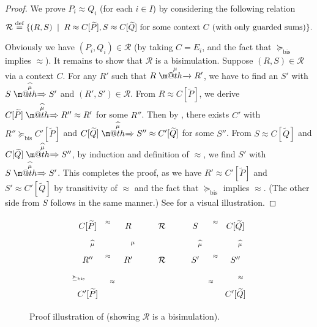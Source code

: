 \documentclass[GCNS]{yincog}
\makeatletter
\def \rightarrowfill{$\m@th\mathord{\smash-}\mkern-6mu%
  \cleaders\hbox{$\mkern-2mu\mathord{\smash-}\mkern-2mu$}\hfill
  \mkern-6mu\mathord\rightarrow$}
\def \rightarrowfillWEAK{$\m@th\mathord{\smash=}\mkern-6mu%
  \cleaders\hbox{$\mkern-2mu\mathord{\smash=}\mkern-2mu$}\hfill
  \mkern-6mu\mathord\Rightarrow$}
\theoremstyle{remark}
\theoremstyle{theorem}
\theoremstyle{remark}
\newcommand{\arr}[1]{\mathrel{\stackrel{{\;\;#1\;\;}}{\mbox{\rightarrowfill}}}}
\newcommand{\Arcap}[1]{\mathrel{\stackrel{{\;\;{\widehat{#1}}\;\;}}{\mbox{\rightarrowfillWEAK}}}}
\newcommand{\ctvtex}[1]{ C \brac{#1} }
\newcommand{\qct}{ C }
\newcommand{\brac}[1]{[#1] }
\def\Rvtex{\mathcal{R}}
\def\stvtex{\; \mid \;}
\def\DSdefi{\stackrel{\text{def}}{=}}
\renewcommand{\tilde}{\widetilde}
\newcommand{\wbvtex}{\approx}
\newcommand{\mcontrBIS}{\mathrel{\succeq_{\mathrm{bis}}}}
\newcommand{\til}{\tilde}
\makeatother
\begin{document}
\begin{proof}
We prove $P_i \wbvtex Q_i$ (for each $i \in I$) by considering the following
relation
%
\begin{equation*}
\Rvtex \DSdefi \{(R,S) \stvtex R \wbvtex \ctvtex{\til P}, S \wbvtex
\ctvtex{\til Q}
\mbox{~for some context $\qct $ (with only guarded sums)} \} .
\end{equation*}

Obviously we have $(P_i,Q_i) \in \Rvtex $ (by taking $C = E_i$, and the
fact that $\mcontrBIS $ implies $\wbvtex $). It remains to show that
$\Rvtex $ is a bisimulation. Suppose $(R, S) \in \Rvtex $ via a context
$C$. For any $R'$ such that $R \arr{\mu} R'$, we have to find an
$S'$ with $S \Arcap{\mu} S'$ and $(R', S') \in \Rvtex $. From
$R \wbvtex C[{\til P}]$, we derive
$C[{\til P}] \Arcap{\mu} R'' \wbvtex R'$ for some $R''$. Then by ,
there exists $C'$ with $R'' \mcontrBIS C'[{\til P}]$ and
$C[{\til Q}] \Arcap{\mu} S'' \wbvtex C'[{\til Q}]$ for some $S''$. From
$S \wbvtex C[{\til Q}]$ and $C[{\til Q}] \Arcap{\mu} S''$, by induction
and definition of $\wbvtex $, we find $S'$ with $S \Arcap{\mu} S'$. This
completes the proof, as we have $R' \wbvtex C'[{\til P}]$ and
$S' \wbvtex C'[{\til Q}]$ by transitivity of $\wbvtex $ and the fact that
$\mcontrBIS $ implies $\wbvtex $. (The other side from $S$ follows in the
same manner.) See  for a visual illustration.
\end{proof}

\begin{figure}%
\vspace{-12pt}
\begin{sgmlfig}\normalsize
%
$$
\xymatrix{
{C[{\til P}]} \ar@{.}[r]^{\wbvtex} \ar@{=>}[d]^{\widehat{\mu}} & {R} \ar@{-}[r]
\ar@{->}[d]^{\mu} & {\Rvtex} \ar@{-}[r] & {S} \ar@{.}[r]^{\wbvtex}
\ar@{=>}[d]^{\widehat{\mu}} & {C[{\til Q}]} \ar@{=>}[d]^{\widehat{\mu}} \\
{R''} \ar@{.}[d]_{\mcontrBIS} \ar@{.}[r]^{\wbvtex} & {R'} \ar@{-}[r]
\ar@{.}[ld]^{\wbvtex} & {\Rvtex} \ar@{-}[r] & {S'} \ar@{.}[r]^{\wbvtex} \ar@{.}[rd]_{\wbvtex}
& {S''} \ar@{.}[d]^{\wbvtex} \\
{C'[{\til P}]} & {} & {} & {} & {C'[{\til Q}]}
}
%
$$\vspace{-12pt}
\end{sgmlfig}
%
\caption{Proof illustration of  (showing
$\Rvtex $ is a bisimulation).}
 \label{fig:310}
\end{figure}
\end{document}
